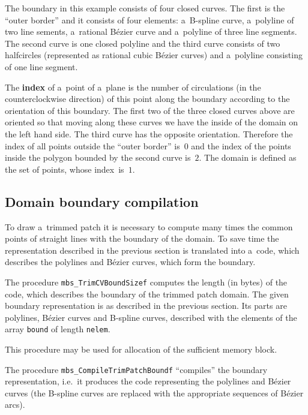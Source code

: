 The boundary in this example consists of four closed curves.
The first is the ``outer border'' and it consists of four elements:
a~B-spline curve, a~polyline of two line sements, a~rational B\'{e}zier curve
and a~polyline of three line segments. The second curve is one
closed polyline and the third curve consists of two halfcircles
(represented as rational cubic B\'{e}zier curves) and a~polyline
consisting of one line segment.

The \textbf{index} of a~point of a~plane is the number of circulations
(in the counterclockwise direction) of this point along the boundary
according to the orientation of this boundary. The first two of the three
closed curves above are oriented so that moving along these curves we have the
inside of the domain on the left hand side. The third curve has the opposite
orientation. Therefore the index of all points outside the ``outer border''
is~$0$ and the index of the points inside the polygon bounded by the second
curve is~$2$. The domain is defined as the set of points, whose index~is~$1$.


\subsection{Domain boundary compilation}

To draw a~trimmed patch it is necessary to compute many times the common points
of straight lines with the boundary of the domain. To save time the
representation described in the previous section is translated into
a~code, which describes the polylines and B\'{e}zier curves, which form
the boundary.

\vspace{\bigskipamount}
The procedure \texttt{mbs\_TrimCVBoundSizef} computes the length
(in bytes) of the code, which describes the boundary of the trimmed
patch domain. The given boundary representation is as described
in the previous section. Its parts are polylines, B\'{e}zier curves
and B-spline curves, described with the elements of the array
\texttt{bound} of length \texttt{nelem}.

This procedure may be used for allocation of the sufficient memory block.

\vspace{\bigskipamount}
The procedure \texttt{mbs\_CompileTrimPatchBoundf} ``compiles''
the boundary representation, i.e.\ it produces the code representing
the polylines and B\'{e}zier curves (the B-spline curves are replaced
with the appropriate sequences of B\'{e}zier arcs).

